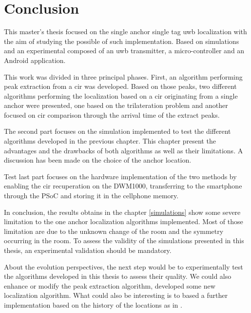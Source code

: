 \chapter{Conclusion}

This master's thesis focused on the single anchor single tag \gls{uwb} localization with the aim of studying the possible of such implementation. Based on simulations and an experimental composed of an \gls{uwb} transmitter, a micro-controller and an Android application.
\vspace{2mm}

This work was divided in three principal phases. First, an algorithm performing peak extraction from a \gls{cir} was developed. Based on those peaks, two different algorithms performing the localization based on a \gls{cir} originating from a single anchor were presented, one based on the trilateration problem and another focused on \gls{cir} comparison through the arrival time of the extract peaks.
\vspace{2mm}

The second part focuses on the simulation implemented to test the different algorithms developed in the previous chapter. This chapter present the advantages and the drawbacks of both algorithms as well as their limitations. A discussion has been made on the choice of the anchor location.
\vspace{2mm}

Test last part focuses on the hardware implementation of the two methods by enabling the \gls{cir} recuperation on the DWM1000, transferring to the smartphone through the PSoC and storing it in the cellphone memory. 
\vspace{2mm}

In conclusion, the results obtains in the chapter \ref{simulations} show some severe limitation to the one anchor localization algorithms implemented. Most of those limitation are due to the unknown change of the room and the symmetry occurring in the room. To assess the validity of the simulations presented in this thesis, an experimental validation should be mandatory. 
\vspace{2mm}

About the evolution perspectives, the next step would be to experimentally test the algorithms developed in this thesis to assess their quality. We could also enhance or modify the peak extraction algorithm, developed some new localization algorithm. What could also be interesting is to based a further implementation based on the history of the locations as in \cite{meissner2010uwb}.